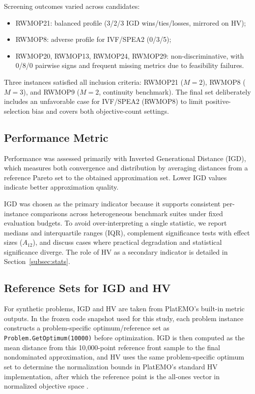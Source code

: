 \documentclass[pdflatex,sn-mathphys-ay]{sn-jnl}%
\theoremstyle{thmstyleone}%
\theoremstyle{thmstyletwo}%
\theoremstyle{thmstylethree}%
\begin{document}
Screening outcomes varied across candidates:
\begin{itemize}
	\item RWMOP21: balanced profile (3/2/3 IGD wins/ties/losses, mirrored on HV);
	\item RWMOP8: adverse profile for IVF/SPEA2 (0/3/5);
	\item RWMOP20, RWMOP13, RWMOP24, RWMOP29: non-discriminative, with 0/8/0 pairwise signs and frequent missing metrics due to feasibility failures.
\end{itemize}

Three instances satisfied all inclusion criteria: RWMOP21 ($M=2$), RWMOP8 ($M=3$), and RWMOP9 ($M=2$, continuity benchmark). The final set deliberately includes an unfavorable case for IVF/SPEA2 (RWMOP8) to limit positive-selection bias and covers both objective-count settings.

\subsection{Performance Metric}\label{subsec:metric}
Performance was assessed primarily with Inverted Generational Distance (IGD), which measures both convergence and distribution by averaging distances from a reference Pareto set to the obtained approximation set. Lower IGD values indicate better approximation quality.

IGD was chosen as the primary indicator because it supports consistent per-instance comparisons across heterogeneous benchmark suites under fixed evaluation budgets. To avoid over-interpreting a single statistic, we report medians and interquartile ranges (IQR), complement significance tests with effect sizes ($A_{12}$), and discuss cases where practical degradation and statistical significance diverge. The role of HV as a secondary indicator is detailed in Section~\ref{subsec:stats}.

\subsection{Reference Sets for IGD and HV}\label{subsec:reference-sets}
For synthetic problems, IGD and HV are taken from PlatEMO's built-in metric outputs. In the frozen code snapshot used for this study, each problem instance constructs a problem-specific optimum/reference set as \texttt{Problem.GetOptimum(10000)} before optimization. IGD is then computed as the mean distance from this 10{,}000-point reference front sample to the final nondominated approximation, and HV uses the same problem-specific optimum set to determine the normalization bounds in PlatEMO's standard HV implementation, after which the reference point is the all-ones vector in normalized objective space \citep{platemo, zambrano2026ivfspea2repo}.
\end{document}

